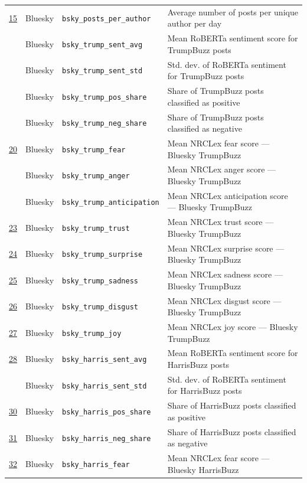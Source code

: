 \begin{longtable}{>{\centering\arraybackslash}p{0.9cm} p{2cm} p{4cm} p{7.5cm}}
\underline{15} & Bluesky & \texttt{bsky\_posts\_per\_author} & Average number of posts per unique author per day \\
16 & Bluesky & \texttt{bsky\_trump\_sent\_avg} & Mean RoBERTa sentiment score for TrumpBuzz posts \\
17 & Bluesky & \texttt{bsky\_trump\_sent\_std} & Std. dev. of RoBERTa sentiment for TrumpBuzz posts \\
18 & Bluesky & \texttt{bsky\_trump\_pos\_share} & Share of TrumpBuzz posts classified as positive \\
19 & Bluesky & \texttt{bsky\_trump\_neg\_share} & Share of TrumpBuzz posts classified as negative \\
\underline{20} & Bluesky & \texttt{bsky\_trump\_fear} & Mean NRCLex fear score --- Bluesky TrumpBuzz \\
21 & Bluesky & \texttt{bsky\_trump\_anger} & Mean NRCLex anger score --- Bluesky TrumpBuzz \\
22 & Bluesky & \texttt{bsky\_trump\_anticipation} & Mean NRCLex anticipation score --- Bluesky TrumpBuzz \\
\underline{23} & Bluesky & \texttt{bsky\_trump\_trust} & Mean NRCLex trust score --- Bluesky TrumpBuzz \\
\underline{24} & Bluesky & \texttt{bsky\_trump\_surprise} & Mean NRCLex surprise score --- Bluesky TrumpBuzz \\
\underline{25} & Bluesky & \texttt{bsky\_trump\_sadness} & Mean NRCLex sadness score --- Bluesky TrumpBuzz \\
\underline{26} & Bluesky & \texttt{bsky\_trump\_disgust} & Mean NRCLex disgust score --- Bluesky TrumpBuzz \\
\underline{27} & Bluesky & \texttt{bsky\_trump\_joy} & Mean NRCLex joy score --- Bluesky TrumpBuzz \\
\underline{28} & Bluesky & \texttt{bsky\_harris\_sent\_avg} & Mean RoBERTa sentiment score for HarrisBuzz posts \\
29 & Bluesky & \texttt{bsky\_harris\_sent\_std} & Std. dev. of RoBERTa sentiment for HarrisBuzz posts \\
\underline{30} & Bluesky & \texttt{bsky\_harris\_pos\_share} & Share of HarrisBuzz posts classified as positive \\
\underline{31} & Bluesky & \texttt{bsky\_harris\_neg\_share} & Share of HarrisBuzz posts classified as negative \\
\underline{32} & Bluesky & \texttt{bsky\_harris\_fear} & Mean NRCLex fear score --- Bluesky HarrisBuzz \\

\end{longtable}
